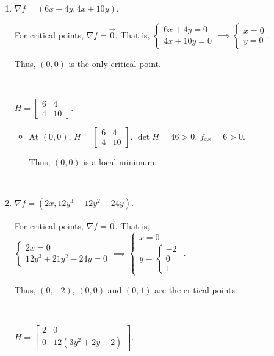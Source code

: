 \begin{enumerate}
    \item $\nabla f = \left( 6x + 4y, 4x + 10y \right)$.
    
    For critical points, $\nabla f = \vec{0}$. That is, $\begin{cases} 6x + 4y = 0 \\ 4x + 10y = 0 \end{cases} \implies \begin{cases} x = 0 \\ y = 0 \end{cases}$. 

    Thus, $(0,0)$ is the only critical point. 

    {~~~}

    $H = \begin{bmatrix} 6 & 4 \\ 4 & 10 \end{bmatrix}$. 
    
    \begin{itemize}
        \item At $(0, 0)$, $H = \begin{bmatrix} 6 & 4 \\ 4 & 10 \end{bmatrix}$. $\det H = 46 > 0$. $f_{xx} = 6 > 0$. 

        Thus, $(0, 0)$ is a local minimum. 
    \end{itemize}
    
    {~~~}

    \item $\nabla f = \left( 2x, 12y^3 + 12y^2 - 24y \right)$.

    For critical points, $\nabla f = \vec{0}$. That is, $\begin{cases} 2x = 0 \\ 12y^3 + 21y^2 - 24y = 0 \end{cases} \implies \begin{cases} x = 0 \\ y = \begin{cases} -2 \\ 0 \\ 1 \end{cases} \end{cases}$. 
    
    Thus, $(0, -2)$, $(0, 0)$ and $(0, 1)$ are the critical points. 

    {~~~}

    $H = \begin{bmatrix} 2 & 0 \\ 0 & 12(3y^2 + 2y - 2) \end{bmatrix}$. 


\end{enumerate}
